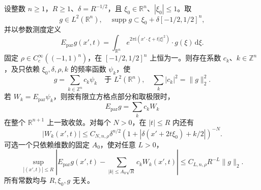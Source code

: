 \begin{proposition}[单帽的波包展开]\label{b2:prop:25-single-cap-packets}
设整数 \(n\geq1\)，\(R\geq1\)、\(\delta=R^{-1/2}\)，且 \(\xi_0\in\mathbb R^n\)、\(|\xi_0|\leq1\)。取
\[
 g\in L^2(\mathbb R^n),\quad
 \operatorname{supp}g\subset
       \xi_0+\delta[-1/2,1/2]^n,
\]
并以参数测度定义
\[
 E_{\mathrm{par}}g(x',t)
 =\int_{\mathbb R^n}
       e^{2\pi\mathrm i(x'\cdot\xi+t|\xi|^2)}
       \cdot g(\xi)\,\mathrm d\xi.
\]
固定 \(\rho\in C_c^\infty((-1,1)^n)\)，在 \([-1/2,1/2]^n\) 上恒为一。则存在系数 \(c_k\)、\(k\in\mathbb Z^n\)，及只依赖 \(\xi_0,\delta,\rho,k\) 的频率函数 \(\psi_k\)，使
\[
 g=\sum_{k\in\mathbb Z^n}c_k\psi_k
       \quad\text{于 }L^2(\mathbb R^n),\quad
 \sum_k|c_k|^2=\|g\|_2^2.
\]
若 \(W_k=E_{\mathrm{par}}\psi_k\)，则按有限立方格点部分和取极限时，
\[
 E_{\mathrm{par}}g=\sum_kc_kW_k
\]
在整个 \(\mathbb R^{n+1}\) 上一致收敛。对每个 \(N>0\)，在 \(|t|\leq R\) 内还有
\[
 |W_k(x',t)|
 \leq C_{N,n,\rho}\delta^{n/2}
  \left(1+\left|\delta(x'+2t\xi_0)+k/2\right|\right)^{-N}.
\]
可选一个只依赖维数的固定 \(A_0\)，使对任意 \(L>0\)，
\[
 \sup_{|(x',t)|\leq R}
 \left|E_{\mathrm{par}}g(x',t)
       -\sum_{|k|\leq A_0\sqrt R}c_kW_k(x',t)\right|
 \leq C_{L,n,\rho}R^{-L}\|g\|_2.
\]
所有常数均与 \(R,\xi_0,g\) 无关。
\end{proposition}
